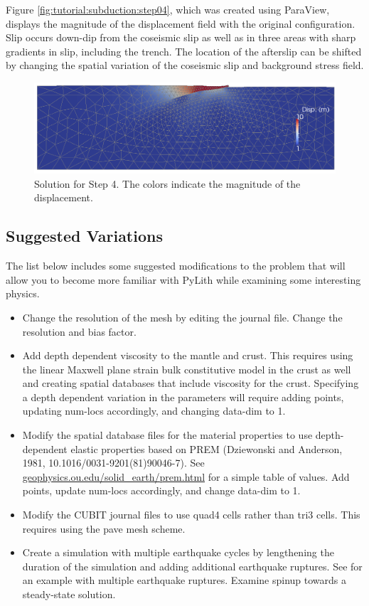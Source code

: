 Figure \vref{fig:tutorial:subduction:step04}, which was created using
ParaView, displays the magnitude of the displacement field with the
original configuration. Slip occurs down-dip from the coseismic slip
as well as in three areas with sharp gradients in slip, including
the trench. The location of the afterslip can be shifted by changing
the spatial variation of the coseismic slip and background stress
field.

\begin{figure}
  \includegraphics[width=4.5in]{examples/figs/subduction_step01_soln}
  \caption{Solution for Step 4. The colors indicate the magnitude of
    the displacement.}
  \label{fig:tutorial:subduction:step04}
\end{figure}


\subsection{Suggested Variations}

The list below includes some suggested modifications to the problem
that will allow you to become more familiar with PyLith while examining
some interesting physics.
\begin{itemize}
\item Change the resolution of the mesh by editing the 
  journal file. Change the resolution and bias factor.
\item Add depth dependent viscosity to the mantle and crust. This requires
  using the linear Maxwell plane strain bulk constitutive model in the
  crust as well and creating spatial databases that include viscosity
  for the crust. Specifying a depth dependent variation in the parameters
  will require adding points, updating num-locs accordingly, and changing
  data-dim to 1.
\item Modify the spatial database files for the material properties to use
  depth-dependent elastic properties based on PREM (Dziewonski and Anderson,
  1981, 10.1016/0031-9201(81)90046-7). See \url{geophysics.ou.edu/solid_earth/prem.html}
  for a simple table of values. Add points, update num-locs accordingly,
  and change data-dim to 1.
\item Modify the CUBIT journal files to use quad4 cells rather than tri3
  cells. This requires using the pave mesh scheme.
\item Create a simulation with multiple earthquake cycles by lengthening
  the duration of the simulation and adding additional earthquake ruptures.
  See  for an example with multiple
  earthquake ruptures. Examine spinup towards a steady-state solution.
\end{itemize}


